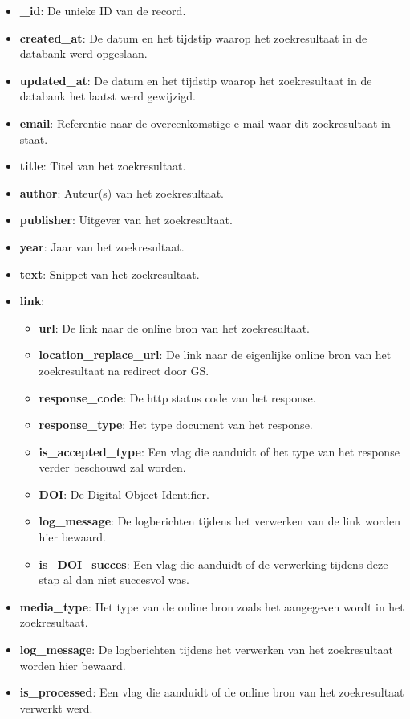 \begin{itemize}
    \item \textbf{\_id}: De unieke ID van de record.
    \item \textbf{created\_at}: De datum en het tijdstip waarop het zoekresultaat in de databank werd opgeslaan.
    \item \textbf{updated\_at}: De datum en het tijdstip waarop het zoekresultaat in de databank het laatst werd gewijzigd. 
    \item \textbf{email}: Referentie naar de overeenkomstige e-mail waar dit zoekresultaat in staat.
    \item \textbf{title}: Titel van het zoekresultaat.
    \item \textbf{author}: Auteur(s) van het zoekresultaat. 
    \item \textbf{publisher}: Uitgever van het zoekresultaat.
    \item \textbf{year}: Jaar van het zoekresultaat.
    \item \textbf{text}: Snippet van het zoekresultaat.
    \item \textbf{link}: 
    \begin{itemize}
        \item \textbf{url}: De link naar de online bron van het zoekresultaat.
        \item \textbf{location\_replace\_url}: De link naar de eigenlijke online bron van het zoekresultaat na redirect door GS.
        \item \textbf{response\_code}: De http status code van het response.
        \item \textbf{response\_type}: Het type document van het response.
        \item \textbf{is\_accepted\_type}: Een vlag die aanduidt of het type van het response verder beschouwd zal worden.
        \item \textbf{DOI}: De Digital Object Identifier.
        \item \textbf{log\_message}: De logberichten tijdens het verwerken van de link worden hier bewaard.
        \item \textbf{is\_DOI\_succes}: Een vlag die aanduidt of de verwerking tijdens deze stap al dan niet succesvol was.
    \end{itemize}
    \item \textbf{media\_type}: Het type van de online bron zoals het aangegeven wordt in het zoekresultaat.
    \item \textbf{log\_message}: De logberichten tijdens het verwerken van het zoekresultaat worden hier bewaard. 
    \item \textbf{is\_processed}: Een vlag die aanduidt of de online bron van het zoekresultaat verwerkt werd.
\end{itemize}


